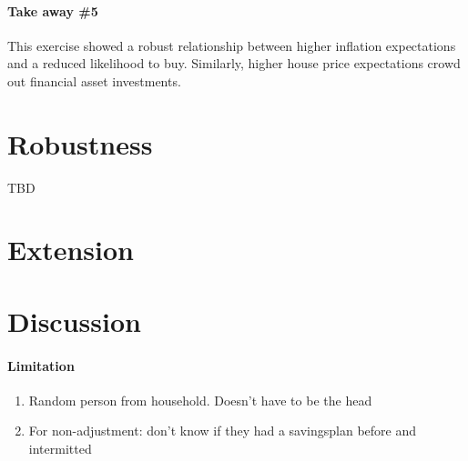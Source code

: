 \documentclass[ProjectABM]{subfiles}
\begin{document}
\paragraph{Take away \#5}
This exercise showed a robust relationship between higher inflation expectations and a reduced likelihood to buy. Similarly, higher house price expectations crowd out financial asset investments.

\section{Robustness}\label{sec:robustness}
TBD

\section{Extension}


\section{Discussion}\label{sec:discussion}
\paragraph{Limitation}
\begin{enumerate}
	\item Random person from household. Doesn't have to be the head
	\item For non-adjustment: don't know if they had a savingsplan before and intermitted
\end{enumerate}

\onlyinsubfile{}
%
\end{document}
